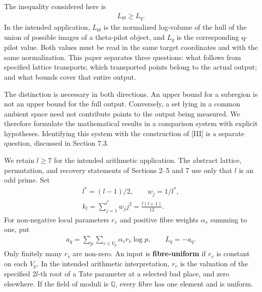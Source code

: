 \documentclass[11pt,a4paper]{amsart}
\begin{document}
The inequality considered here is
\begin{equation}
\begin{gathered}
L_\Theta\ge L_q.
\end{gathered}
\tag{LB}\label{eq:LB}
\end{equation}
In the intended application, $L_\Theta$ is the normalized log-volume of the hull of the union of possible images of a theta-pilot object, and $L_q$ is the corresponding q-pilot value. Both values must be read in the same target coordinates and with the same normalization. This paper separates three questions: what follows from specified lattice transports; which transported points belong to the actual output; and what bounds cover that entire output.


The distinction is necessary in both directions. An upper bound for a subregion is not an upper bound for the full output. Conversely, a set lying in a common ambient space need not contribute points to the output being measured. We therefore formulate the mathematical results in a comparison system with explicit hypotheses. Identifying this system with the construction of [III] is a separate question, discussed in Section 7.3.


We retain $l\ge7$ for the intended arithmetic application. The abstract lattice, permutation, and recovery statements of Sections 2--5 and 7 use only that $l$ is an odd prime. Set
\begin{equation}
\begin{gathered}
l^*=(l-1)/2,\qquad w_j=1/l^*,\\ k_l=\sum_{j=1}^{l^*}w_jj^2=\frac{l(l+1)}{12}.
\end{gathered}
\tag{1.1}\label{eq:1.1}
\end{equation}
For non-negative local parameters $r_v$ and positive fibre weights $\alpha_v$ summing to one, put
\begin{equation}
\begin{gathered}
a_q=\sum_p\sum_{v\in V_p}\alpha_vr_v\log p,\qquad L_q=-a_q.
\end{gathered}
\tag{1.2}\label{eq:1.2}
\end{equation}
Only finitely many $r_v$ are non-zero. An input is \textbf{fibre-uniform} if $r_v$ is constant on each $V_p$. In the intended arithmetic interpretation, $r_v$ is the valuation of the specified $2l$-th root of a Tate parameter at a selected bad place, and zero elsewhere. If the field of moduli is $\mathbb Q$, every fibre has one element and is uniform.
\end{document}
